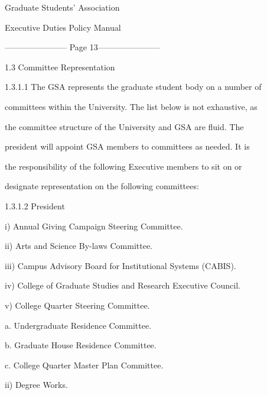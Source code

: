                                       Graduate Students’ Association  

                                     Executive Duties Policy Manual  

  


----------------------- Page 13-----------------------

                         1.3       Committee Representation   

  

1.3.1.1            The GSA represents the graduate student body on a number of  

         committees within the University. The list below is not exhaustive, as  

         the  committee  structure  of  the  University  and  GSA  are  fluid.  The  

         president  will  appoint  GSA  members  to  committees  as  needed.  It  is  

         the  responsibility  of  the  following  Executive  members  to  sit  on  or  

         designate representation on the following committees:   

  

1.3.1.2            President   

  

         i)        Annual Giving Campaign Steering Committee.   

  

         ii)       Arts and Science By-laws Committee.   

  

         iii)      Campus Advisory Board for Institutional Systems (CABIS).   

  

         iv)       College of Graduate Studies and Research Executive Council.   

  

         v)        College Quarter Steering Committee.   

  

              a.       Undergraduate Residence Committee.   

              b.        Graduate House Residence Committee.   

  

              c.        College Quarter Master Plan Committee.   

  

         ii)       Degree Works.   

